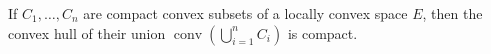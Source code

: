 If $C_1, \ldots, C_n$ are compact convex subsets of a locally convex space $E$, then the convex hull of their union $\operatorname{conv}\left(\bigcup_{i=1}^{n} C_i\right)$ is compact.
